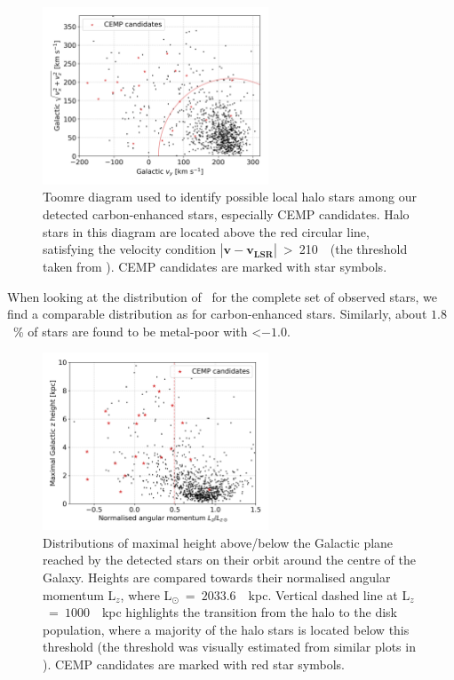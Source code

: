 \begin{figure}
	\centering
	\includegraphics[width=0.6\textwidth]{carbon_orbits_vy_vxvz.png}
	\caption{Toomre diagram used to identify possible local halo stars among our detected carbon-enhanced stars, especially CEMP candidates. Halo stars in this diagram are located above the red circular line, satisfying the velocity condition $\left|\mathbf{v} - \mathbf{v_{LSR}} \right|$~>~210~\kms\ (the threshold taken from \citet{2018ApJ...860L..11K}). CEMP candidates are marked with star symbols.}
	\label{fig:orbits_vxvyvz}
\end{figure}

When looking at the distribution of \Feh\ for the complete set of observed stars, we find a comparable distribution as for carbon-enhanced stars. Similarly, about $1.8$~\% of stars are found to be metal-poor with \Feh \textless $-1.0$.

\begin{figure}
	\centering
	\includegraphics[width=0.6\textwidth]{carbon_orbits_zmax_lznorm.png}
	\caption{Distributions of maximal height above/below the Galactic plane reached by the detected stars on their orbit around the centre of the Galaxy. Heights are compared towards their normalised angular momentum L$_z$, where L$_\odot$~=~$2033.6$~\kms~kpc. Vertical dashed line at L$_z$~=~$1000$~\kms~kpc highlights the transition from the halo to the disk population, where a majority of the halo stars is located below this threshold (the threshold was visually estimated from similar plots in \citet{2018ApJ...860L..11K}). CEMP candidates are marked with red star symbols.}
	\label{fig:orbits_zmax}
\end{figure}


